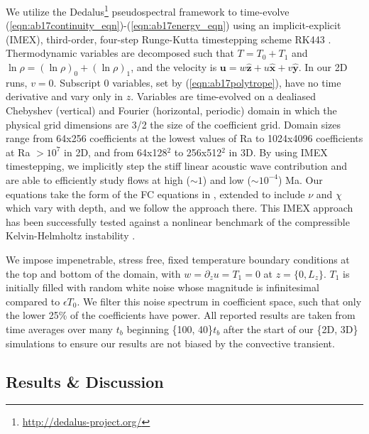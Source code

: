 We utilize the Dedalus\footnote{\url{http://dedalus-project.org/}} pseudospectral framework \citep{burns&all2016} to time-evolve (\ref{eqn:ab17continuity_eqn})-(\ref{eqn:ab17energy_eqn}) using an implicit-explicit (IMEX), third-order, four-step Runge-Kutta timestepping scheme RK443 \citep{ascher&all1997}.  
Thermodynamic variables are decomposed such that $T = T_0 + T_1$ and $\ln\rho = (\ln\rho)_0 + (\ln\rho)_1$, and the velocity is $\bm{u} = w\bm{\hat{z}} + u\bm{\hat{x}} + v\bm{\hat{y}}$.
In our 2D runs, $v = 0$.
Subscript 0 variables, set by (\ref{eqn:ab17polytrope}), have no time derivative and vary only in $z$.
Variables are time-evolved on a dealiased Chebyshev (vertical) and Fourier (horizontal, periodic) domain in which the physical grid dimensions are 3/2 the size of the coefficient grid.  
Domain sizes range from 64x256 coefficients at the lowest values of Ra to 1024x4096 coefficients at Ra $> 10^{7}$ in 2D, and from 64x128$^2$ to 256x512$^2$ in 3D. 
By using IMEX timestepping, we implicitly step the stiff linear acoustic wave contribution and are able to efficiently study flows at high ($\sim 1$) and low ($\sim 10^{-4}$) Ma.  
Our equations take the form of the FC equations in \cite{lecoanet&all2014}, extended to include $\nu$ and $\chi$ which vary with depth, and we follow the approach there.
This IMEX approach has been successfully tested against a nonlinear benchmark  of the compressible Kelvin-Helmholtz instability \citep{Lecoanet_et_al_2016_KH}.

We impose impenetrable, stress free, fixed temperature boundary conditions at the top and bottom of the domain, with $w = \partial_z u = T_1 = 0$ at $z = \{0, L_z\}$. 
$T_1$ is initially filled with random white noise whose magnitude is infinitesimal compared to $\epsilon T_0$.
We filter this noise spectrum in coefficient space, such that only the lower 25\% of the coefficients have power. 
All reported results are taken from time averages over many $t_b$ beginning \{100, 40\}$t_b$ after the start of our \{2D, 3D\} simulations to ensure our results are not biased by the convective transient.

\subsection{Results \& Discussion}
\label{sec:results}


